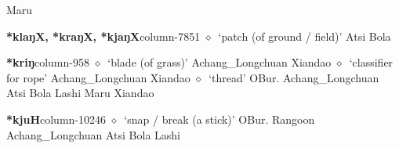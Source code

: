 \hspace{1ex}
         Maru 
  \item {\footnotesize \textbf{*klaŋX, *kraŋX, *kjaŋX}}{\tiny column-7851}
         $\diamond$~`patch (of ground / field)'
         Atsi 
\hspace{1ex}
         Bola 
  \item {\footnotesize \textbf{*kriŋ}}{\tiny column-958}
         $\diamond$~`blade (of grass)'
         Achang\_Longchuan 
\hspace{1ex}
         Xiandao 
\hspace{1ex}
         $\diamond$~`classifier for rope'
         Achang\_Longchuan 
\hspace{1ex}
         Xiandao 
\hspace{1ex}
         $\diamond$~`thread'
         OBur. 
\hspace{1ex}
         Achang\_Longchuan 
\hspace{1ex}
         Atsi 
\hspace{1ex}
         Bola 
\hspace{1ex}
         Lashi 
\hspace{1ex}
         Maru 
\hspace{1ex}
         Xiandao 
  \item {\footnotesize \textbf{*kjuH}}{\tiny column-10246}
         $\diamond$~`snap / break (a stick)'
         OBur. 
\hspace{1ex}
         Rangoon 
\hspace{1ex}
         Achang\_Longchuan 
\hspace{1ex}
         Atsi 
\hspace{1ex}
         Bola 
\hspace{1ex}
         Lashi 
\hspace{1ex}
